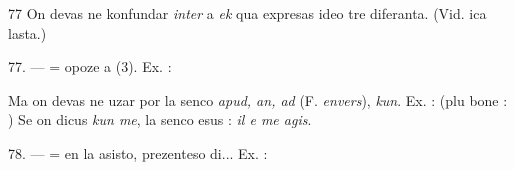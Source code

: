 \begin{VUpage}[81]{77}
On devas ne konfundar \textit{inter} a \textit{ek} qua expresas ideo tre\nl
diferanta. (Vid. ica lasta.)

\VUblanc{4.76pt}%
77. ---  = opoze a (3). Ex. : \nl
{}\nl
{}\nl
{}

Ma on devas ne uzar  por la senco \textit{apud, an, ad}\nl
(F. \textit{envers}), \textit{kun}. Ex. :  (plu bone : ) \nl
{} Se on dicus \textit{kun me}, la\nl
senco esus : \textit{il e me agis}.

\VUblanc{5.66pt}%
78. ---  = en la asisto, prezenteso di... Ex. :\nl
{}\parplein
\end{VUpage}

